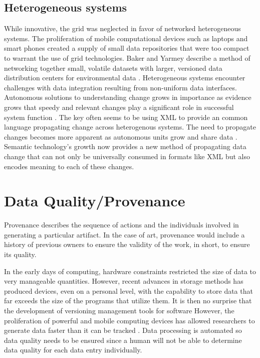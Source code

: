 \subsection{Heterogeneous systems}
While innovative, the grid was neglected in favor of networked heterogeneous systems.
The proliferation of mobile computational devices such as laptops and smart phones created a supply of small data repositories that were too compact to warrant the use of grid technologies.
Baker and Yarmey describe a method of networking together small, volatile datasets with larger, versioned data distribution centers for environmental data \cite{Baker2009}.
Heterogeneous systems encounter challenges with data integration resulting from non-uniform data interfaces.
Autonomous solutions to understanding change grows in importance as evidence grows that speedy and relevant changes play a significant role in successful system function \cite{Bouzeghoub:2004:FAD:1012453.1012464}.
The key often seems to be using XML to provide an common language propagating change across heterogenous systems.
The need to propagate changes becomes more apparent as autonomous units grow and share data \cite{Systems02champagne:data}.
Semantic technology's growth now provides a new method of propagating data change that can not only be universally consumed in formats like XML but also encodes meaning to each of these changes.

\section{Data Quality/Provenance}

Provenance describes the sequence of actions and the individuals involved in generating a particular artifact.
In the case of art, provenance would include a history of previous owners to ensure the validity of the work, in short, to ensure its quality.

In the early days of computing, hardware constraints restricted the size of data to very manageable quantities.
However, recent advances in storage methods has produced devices, even on a personal level, with the capability to store data that far exceeds the size of the programs that utilize them.
It is then no surprise that the development of versioning management tools for software 
However, the proliferation of powerful and mobile computing devices has allowed researchers to generate data faster than it can be tracked \cite{Bose:2005:LRS:1057977.1057978}.
Data processing is automated so data quality needs to be ensured since a human will not be able to determine data quality for each data entry individually.

